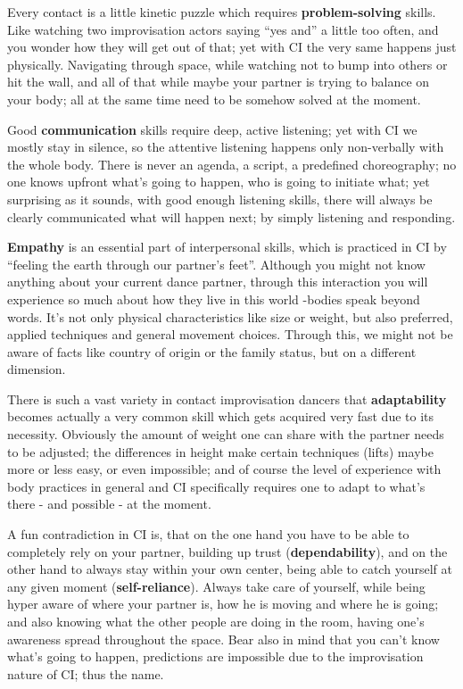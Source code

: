 Every contact is a little kinetic puzzle which requires \textbf{problem-solving} skills.
Like watching two improvisation actors saying ``yes and'' a little too often, and you wonder how they will get out of that; yet with CI the very same happens just physically.
Navigating through space, while watching not to bump into others or hit the wall, and all of that while maybe your partner is trying to balance on your body; all at the same time need to be somehow solved at the moment.

Good \textbf{communication} skills require deep, active listening;
yet with CI we mostly stay in silence, so the attentive listening happens only non-verbally with the whole body.
There is never an agenda, a script, a predefined choreography;
no one knows upfront what's going to happen, who is going to initiate what; yet surprising as it sounds, with good enough listening skills, there will always be clearly communicated what will happen next; by simply listening and responding.

\textbf{Empathy} is an essential part of interpersonal skills, which is practiced in CI by ``feeling the earth through our partner's feet''.
Although you might not know anything about your current dance partner, through this interaction you will experience so much about how they live in this world -bodies speak beyond words.
It's not only physical characteristics like size or weight, but also preferred, applied techniques and general movement choices.
Through this, we might not be aware of facts like country of origin or the family status, but on a different dimension.

There is such a vast variety in contact improvisation dancers that \textbf{adaptability} becomes actually a very common skill which gets acquired very fast due to its necessity.
Obviously the amount of weight one can share with the partner needs to be adjusted;
the differences in height make certain techniques (lifts) maybe more or less easy, or even impossible; and of course the level of experience with body practices in general and CI specifically requires one to adapt to what's there - and possible - at the moment.

A fun contradiction in CI is, that on the one hand you have to be able to completely rely on your partner, building up trust (\textbf{dependability}), and on the other hand to always stay within your own center, being able to catch yourself at any given moment (\textbf{self-reliance}).
Always take care of yourself, while being hyper aware of where your partner is, how he is moving and where he is going;
and also knowing what the other people are doing in the room, having one's awareness spread throughout the space.
Bear also in mind that you can't know what's going to happen, predictions are impossible due to the improvisation nature of CI; thus the name.

